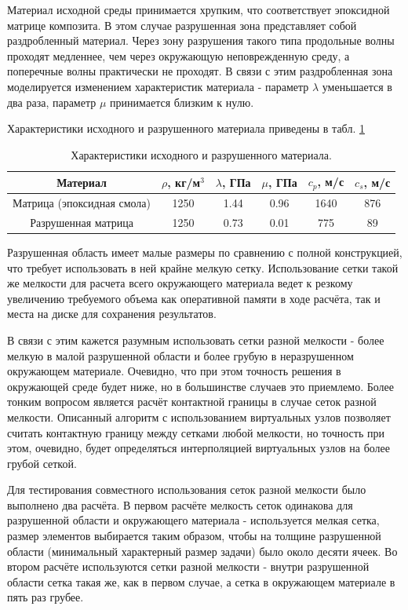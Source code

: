 Материал исходной среды принимается хрупким, что соответствует эпоксидной матрице композита. В этом случае разрушенная зона представляет собой раздробленный материал. Через зону разрушения такого типа продольные волны проходят медленнее, чем через окружающую неповрежденную среду, а поперечные волны практически не проходят. В связи с этим раздробленная зона моделируется изменением характеристик материала - параметр $\lambda$ уменьшается в два раза, параметр $\mu$ принимается близким к нулю. 

Характеристики исходного и разрушенного материала приведены в табл. \ref{tbl:crack}
\begin{table}
\centering
\begin{tabular}{|c|c|c|c|c|c|}
\hline
Материал & $\rho$, кг/м$^{3}$ & $\lambda$, ГПа & $\mu$, ГПа &
$c_p$, м/с & $c_s$, м/с \\
\hline
Матрица (эпоксидная смола) & 1250 & 1.44 & 0.96 & 1640 & 876 \\
Разрушенная матрица & 1250 & 0.73 & 0.01 & 775 & 89 \\
\hline
\end{tabular}
\caption{Характеристики исходного и разрушенного материала.}
\label{tbl:crack}
\end{table}

Разрушенная область имеет малые размеры по сравнению с полной конструкцией, что требует использовать в ней крайне мелкую сетку. Использование сетки такой же мелкости для расчета всего окружающего материала ведет к резкому увеличению требуемого объема как оперативной памяти в ходе расчёта, так и места на диске для сохранения результатов.

В связи с этим кажется разумным использовать сетки разной мелкости - более мелкую в малой разрушенной области и более грубую в неразрушенном окружающем материале. Очевидно, что при этом точность решения в окружающей среде будет ниже, но в большинстве случаев это приемлемо. Более тонким вопросом является расчёт контактной границы в случае сеток разной мелкости. Описанный алгоритм с использованием виртуальных узлов позволяет считать контактную границу между сетками любой мелкости, но точность при этом, очевидно, будет определяться интерполяцией виртуальных узлов на более грубой сеткой.

Для тестирования совместного использования сеток разной мелкости было выполнено два расчёта. В первом расчёте мелкость сеток одинакова для разрушенной области и окружающего материала - используется мелкая сетка, размер элементов выбирается таким образом, чтобы на толщине разрушенной области (минимальный характерный размер задачи) было около десяти ячеек. Во втором расчёте используются сетки разной мелкости - внутри разрушенной области сетка такая же, как в первом случае, а сетка в окружающем материале в пять раз грубее.

